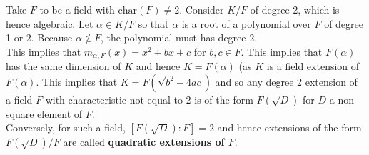 \documentclass{memoir}
\begin{document}
\begin{exmp}
	Take \(F\) to be a field with \(\textrm{char}(F) \neq 2\). Consider \(K/F\) of degree 2, which is hence algebraic. Let \(\alpha  \in K / F\) so that \(\alpha \) is a root of a polynomial over \(F\) of degree 1 or 2. Because \(\alpha \not\in F\), the polynomial must has degree 2.\\

	This implies that \(m_{\alpha ,F}(x) = x^2+bx+c\) for \(b,c \in F\). This implies that \(F(\alpha )\) has the same dimension of \(K\) and hence \(K = F(\alpha )\) (as \(K\) is a field extension of \(F(\alpha )\). This implies that \(K = F(\sqrt{b^2-4ac} )\) and so any degree 2 extension of a field \(F\) with characteristic not equal to \(2\) is of the form \(F(\sqrt{D} )\) for \(D\) a non-square element of \(F\).\\

	Conversely, for such a field, \([F(\sqrt{D} ) : F] = 2\) and hence extensions of the form \(F(\sqrt{D} ) / F\) are called \textbf{quadratic extensions of \(F\)}.
\end{exmp}
\end{document}
